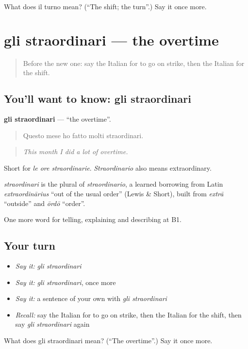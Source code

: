 \begin{tcolorbox}[breakable,colback=teal!4,colframe=teal!35!black,title={Before you move on}]
What does il turno mean? (\textquotedblleft{}The shift; the turn\textquotedblright{}.) Say it once more.
\end{tcolorbox}
\section[gli straordinari]{gli straordinari — the overtime}

\label{lesson:IT-C359-straordinari}



\begin{quote}
Before the new one: say the Italian for to go on strike, then the Italian for the shift.
\end{quote}

\subsection*{You'll want to know: gli straordinari}
\textbf{gli straordinari} — \textquotedblleft{}the overtime\textquotedblright{}.

\begin{quote}
Questo mese ho fatto molti straordinari.
\end{quote}

\begin{quote}
\emph{This month I did a lot of overtime.}
\end{quote}

Short for \emph{le ore straordinarie}. \emph{Straordinario} also means extraordinary.

\begin{cousinweb}
\emph{straordinari} is the plural of \emph{straordinario}, a learned borrowing from Latin \emph{extraordinārius} \textquotedblleft{}out of the usual order\textquotedblright{} (Lewis \& Short), built from \emph{extrā} \textquotedblleft{}outside\textquotedblright{} and \emph{ōrdō} \textquotedblleft{}order\textquotedblright{}.
\end{cousinweb}

\begin{grammarlens}[title={What you've built}]
One more word for telling, explaining and describing at B1.
\end{grammarlens}

\subsection*{Your turn}
\begin{itemize}
\raggedright
  \item \emph{Say it:} \emph{gli straordinari}
  \item \emph{Say it:} \emph{gli straordinari}, once more
  \item \emph{Say it:} a sentence of your own with \emph{gli straordinari}
  \item \emph{Recall:} say the Italian for to go on strike, then the Italian for the shift, then say \emph{gli straordinari} again
\end{itemize}

\begin{tcolorbox}[breakable,colback=teal!4,colframe=teal!35!black,title={Before you move on}]
What does gli straordinari mean? (\textquotedblleft{}The overtime\textquotedblright{}.) Say it once more.
\end{tcolorbox}
